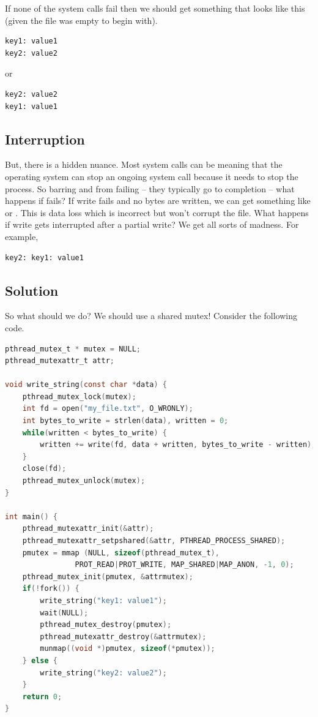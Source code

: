 If none of the system calls fail then we should get something that looks like this (given the file was empty to begin with).

\begin{lstlisting}
key1: value1
key2: value2
\end{lstlisting}

or

\begin{lstlisting}
key2: value2
key1: value1
\end{lstlisting}

\subsection{Interruption}\label{interruption}

But, there is a hidden nuance. Most system calls can be  meaning that the operating system can stop an ongoing system call because it needs to stop the process. So barring    and  from failing -- they typically go to completion -- what happens if  fails? If write fails and no bytes are written, we can get something like  or . This is data loss which is incorrect but won't corrupt the file. What happens if write gets interrupted after a partial write? We get all sorts of madness. For example,

\begin{lstlisting}
key2: key1: value1
\end{lstlisting}

\subsection{Solution}\label{solution}

So what should we do? We should use a shared mutex! Consider the following code.

\begin{lstlisting}[language=C]
pthread_mutex_t * mutex = NULL;
pthread_mutexattr_t attr;

void write_string(const char *data) {
    pthread_mutex_lock(mutex);
    int fd = open("my_file.txt", O_WRONLY);
    int bytes_to_write = strlen(data), written = 0;
    while(written < bytes_to_write) {
        written += write(fd, data + written, bytes_to_write - written);
    }
    close(fd);
    pthread_mutex_unlock(mutex);
}

int main() {
    pthread_mutexattr_init(&attr);
    pthread_mutexattr_setpshared(&attr, PTHREAD_PROCESS_SHARED);
    pmutex = mmap (NULL, sizeof(pthread_mutex_t), 
                PROT_READ|PROT_WRITE, MAP_SHARED|MAP_ANON, -1, 0);
    pthread_mutex_init(pmutex, &attrmutex);
    if(!fork()) {
        write_string("key1: value1");
        wait(NULL);
        pthread_mutex_destroy(pmutex);
        pthread_mutexattr_destroy(&attrmutex); 
        munmap((void *)pmutex, sizeof(*pmutex));
    } else {
        write_string("key2: value2");
    }
    return 0;
}
\end{lstlisting}

